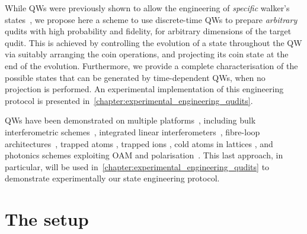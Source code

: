 While \acp{QW} were previously shown to allow the engineering of \emph{specific} walker's states~\cite{chandrashekar2008optimizing,majury2018robust}, we propose here a scheme to use discrete-time \acp{QW} to prepare \emph{arbitrary} qudits with high probability and fidelity, for arbitrary dimensions of the target qudit.
This is achieved by controlling the evolution of a state throughout the QW via suitably arranging the coin operations, and projecting its coin state at the end of the evolution.
Furthermore, we provide a complete characterisation of the possible states that can be generated by time-dependent QWs, when no projection is performed.
An experimental implementation of this engineering protocol is presented in~\cref{chapter:experimental_engineering_qudits}.

QWs have been demonstrated on multiple platforms~\cite{manouchehri2014physical}, including bulk interferometric schemes~\cite{broome2010discrete,kitagawa2012observation,vitelli2013joining}, integrated linear interferometers~\cite{sansoni2012twoparticle, crespi2013anderson, harris2015bosonic, pitsios2016photonic}, fibre-loop architectures~\cite{schreiber2010photons, schreiber2012a, boutari2016large}, trapped atoms \cite{karski2009quantum}, trapped ions \cite{schmitz2009quantum, zhringer2010realization}, cold atoms in lattices \cite{weitenberg2011singlespin, fukuhara2013microscopic, preiss2015strongly}, and photonics schemes exploiting OAM and polarisation~\cite{cardano2015quantum,cardano2016statistical}. This last approach, in particular, will be used in~\cref{chapter:experimental_engineering_qudits} to demonstrate experimentally our state engineering protocol.


\section{The setup}
\label{sec:QWs:setup}

